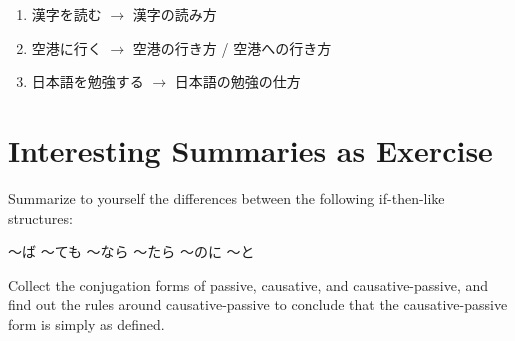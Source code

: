 \documentclass[notoc,notitlepage]{tufte-book}
\begin{document}
\begin{eg}
  \begin{enumerate}
    \item 漢字を読む $\to$ 漢字の読み方
    \item 空港に行く $\to$ 空港の行き方 / 空港への行き方
    \item 日本語を勉強する $\to$ 日本語の勉強の仕方
  \end{enumerate}
\end{eg}



\appendix

\chapter{Interesting Summaries as Exercise}%
\label{chp:interesting_summaries_as_exercise}

\begin{ex}
  Summarize to yourself the differences between the following if-then-like
  structures:
  \begin{center}
  〜ば \quad 〜ても \quad 〜なら \quad 〜たら \quad 〜のに \quad 〜と
  \end{center}
\end{ex}

\begin{ex}
  Collect the conjugation forms of passive, causative, and causative-passive,
  and find out the rules around causative-passive to conclude that
  the causative-passive form is simply as defined.
\end{ex}


\backmatter

\fancyhead[LE]{\thepage \enspace \textsl{\leftmark}}



\printindex
\end{document}
